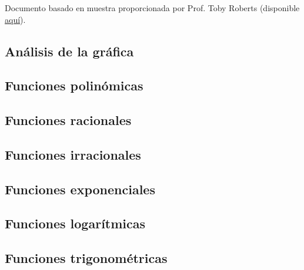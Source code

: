 Documento basado en muestra proporcionada por Prof. Toby Roberts (disponible \href{http://www.maths.adelaide.edu.au/anthony.roberts/LaTeX/Src/maths.tex}{aquí}).

\subsection{Análisis de la gráfica}


\subsection{Funciones polinómicas}


\subsection{Funciones racionales}


\subsection{Funciones irracionales}


\subsection{Funciones exponenciales}


\subsection{Funciones logarítmicas}


\subsection{Funciones trigonométricas}

